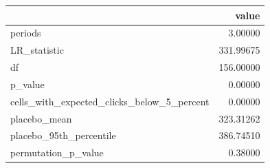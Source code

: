 \begin{tabular}{lr}
\toprule
 & value \\
\midrule
periods & 3.00000 \\
LR\_statistic & 331.99675 \\
df & 156.00000 \\
p\_value & 0.00000 \\
cells\_with\_expected\_clicks\_below\_5\_percent & 0.00000 \\
placebo\_mean & 323.31262 \\
placebo\_95th\_percentile & 386.74510 \\
permutation\_p\_value & 0.38000 \\
\bottomrule
\end{tabular}
